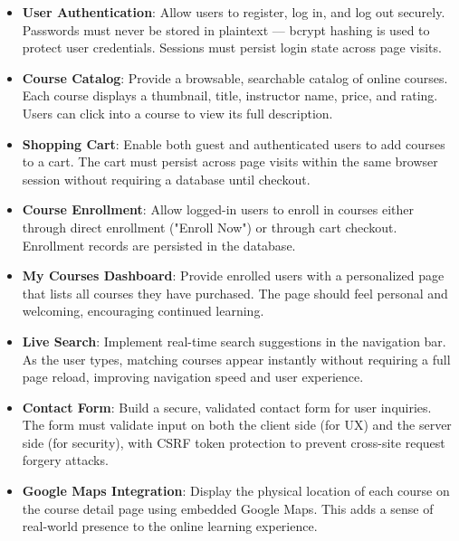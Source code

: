 \documentclass[12pt,a4paper]{report}
\begin{document}
\begin{itemize}
    \item \textbf{User Authentication}: Allow users to register, log in, and log out securely. Passwords must never be stored in plaintext — bcrypt hashing is used to protect user credentials. Sessions must persist login state across page visits.
    
    \item \textbf{Course Catalog}: Provide a browsable, searchable catalog of online courses. Each course displays a thumbnail, title, instructor name, price, and rating. Users can click into a course to view its full description.
    
    \item \textbf{Shopping Cart}: Enable both guest and authenticated users to add courses to a cart. The cart must persist across page visits within the same browser session without requiring a database until checkout.
    
    \item \textbf{Course Enrollment}: Allow logged-in users to enroll in courses either through direct enrollment ("Enroll Now") or through cart checkout. Enrollment records are persisted in the database.
    
    \item \textbf{My Courses Dashboard}: Provide enrolled users with a personalized page that lists all courses they have purchased. The page should feel personal and welcoming, encouraging continued learning.
    
    \item \textbf{Live Search}: Implement real-time search suggestions in the navigation bar. As the user types, matching courses appear instantly without requiring a full page reload, improving navigation speed and user experience.
    
    \item \textbf{Contact Form}: Build a secure, validated contact form for user inquiries. The form must validate input on both the client side (for UX) and the server side (for security), with CSRF token protection to prevent cross-site request forgery attacks.
    
    \item \textbf{Google Maps Integration}: Display the physical location of each course on the course detail page using embedded Google Maps. This adds a sense of real-world presence to the online learning experience.
\end{itemize}
\end{document}
